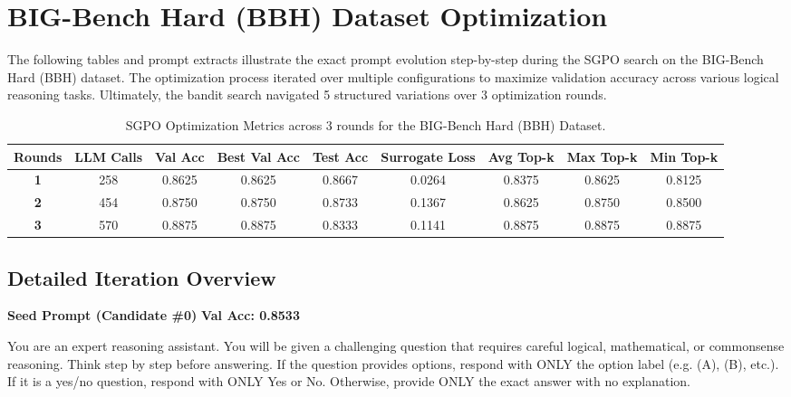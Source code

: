 \section{BIG-Bench Hard (BBH) Dataset Optimization}

The following tables and prompt extracts illustrate the exact prompt evolution step-by-step during the SGPO search on the BIG-Bench Hard (BBH) dataset. The optimization process iterated over multiple configurations to maximize validation accuracy across various logical reasoning tasks. Ultimately, the bandit search navigated 5 structured variations over 3 optimization rounds.

\begin{table}[htbp]
    \centering
    \begin{tabular}{ccccccccc}
    \toprule
    \textbf{Rounds} & \textbf{LLM Calls} & \textbf{Val Acc} & \textbf{Best Val Acc} & \textbf{Test Acc} & \textbf{Surrogate Loss} & \textbf{Avg Top-k} & \textbf{Max Top-k} & \textbf{Min Top-k} \\
    \midrule
    \textbf{1} & 258 & 0.8625 & 0.8625 & 0.8667 & 0.0264 & 0.8375 & 0.8625 & 0.8125 \\
    \textbf{2} & 454 & 0.8750 & 0.8750 & 0.8733 & 0.1367 & 0.8625 & 0.8750 & 0.8500 \\
    \textbf{3} & 570 & 0.8875 & 0.8875 & 0.8333 & 0.1141 & 0.8875 & 0.8875 & 0.8875 \\
    \bottomrule
    \end{tabular}
    \caption{SGPO Optimization Metrics across 3 rounds for the BIG-Bench Hard (BBH) Dataset.}
    \label{tab:bbh_metrics}
\end{table}

\subsection*{Detailed Iteration Overview}

\begin{roundbox}
\textbf{Seed Prompt (Candidate \#0)} \hfill \textbf{Val Acc: 0.8533}
\end{roundbox}

\begin{prompttext}
You are an expert reasoning assistant. You will be given a challenging question that requires careful logical, mathematical, or commonsense reasoning. Think step by step before answering. If the question provides options, respond with ONLY the option label (e.g. (A), (B), etc.). If it is a yes/no question, respond with ONLY Yes or No. Otherwise, provide ONLY the exact answer with no explanation.
\end{prompttext}

